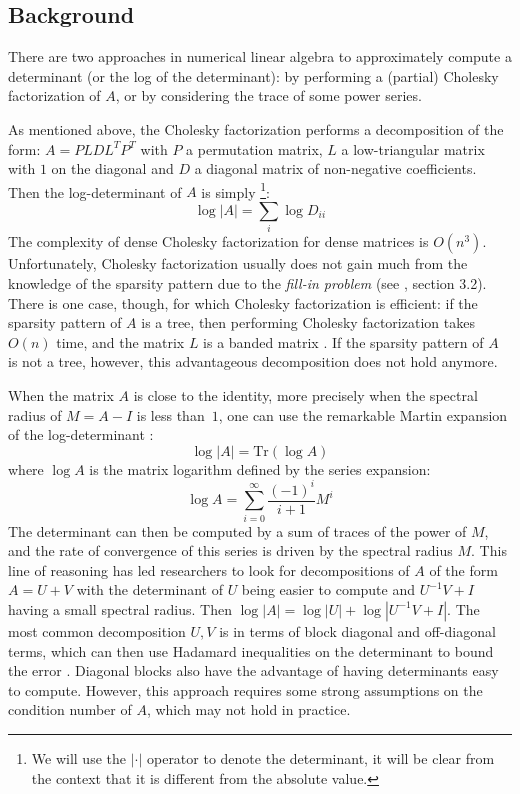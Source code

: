 \subsection{Background}

There are two approaches in numerical linear algebra to approximately
compute a determinant (or the log of the determinant): by performing
a (partial) Cholesky factorization of $A$, or by considering the
trace of some power series.

As mentioned above, the Cholesky factorization performs a decomposition
of the form: $A=PLDL^{T}P^{T}$ with $P$ a permutation matrix, $L$
a low-triangular matrix with $1$ on the diagonal and $D$ a diagonal
matrix of non-negative coefficients. Then the log-determinant of $A$
is simply%
\footnote{We will use the $\left|\cdot\right|$ operator to denote the determinant,
it will be clear from the context that it is different from the absolute
value.%
}: 
\[
\log\left|A\right|=\sum_{i}\log D_{ii}
\]
The complexity of dense Cholesky factorization for dense matrices
is $O\left(n^{3}\right)$. Unfortunately, Cholesky factorization usually
does not gain much from the knowledge of the sparsity pattern due
to the \emph{fill-in problem} (see \cite{meurant1999computer}, section
3.2). There is one case, though, for which Cholesky factorization
is efficient: if the sparsity pattern of $A$ is a tree, then performing
Cholesky factorization takes $O\left(n\right)$ time, and the matrix
$L$ is a banded matrix \cite{liu1990eliminationtrees}. If the sparsity
pattern of $A$ is not a tree, however, this advantageous decomposition
does not hold anymore.

When the matrix $A$ is close to the identity, more precisely when
the spectral radius of $M=A-I$ is less than~$1$, one can use the
remarkable Martin expansion of the log-determinant \cite{martin1992approximations}:
\begin{equation}
\log\left|A\right|=\text{Tr}\left(\log A\right)\label{eq:martin-expansion}
\end{equation}
where $\log A$ is the matrix logarithm defined by the series expansion:
\begin{equation}
\log A=\sum_{i=0}^{\infty}\frac{\left(-1\right)^{i}}{i+1}M^{i}\label{eq:matrix-log}
\end{equation}
The determinant can then be computed by a sum of traces of the power
of $M$, and the rate of convergence of this series is driven by the
spectral radius $M$. This line of reasoning has led researchers to
look for decompositions of $A$ of the form $A=U+V$ with the determinant
of $U$ being easier to compute and $U^{-1}V+I$ having a small spectral
radius. Then $\log\left|A\right|=\log\left|U\right|+\log\left|U^{-1}V+I\right|$.
The most common decomposition $U,V$ is in terms of block diagonal
and off-diagonal terms, which can then use Hadamard inequalities on
the determinant to bound the error \cite{Ipsen2006}. Diagonal blocks
also have the advantage of having determinants easy to compute. However,
this approach requires some strong assumptions on the condition number
of $A$, which may not hold in practice.

